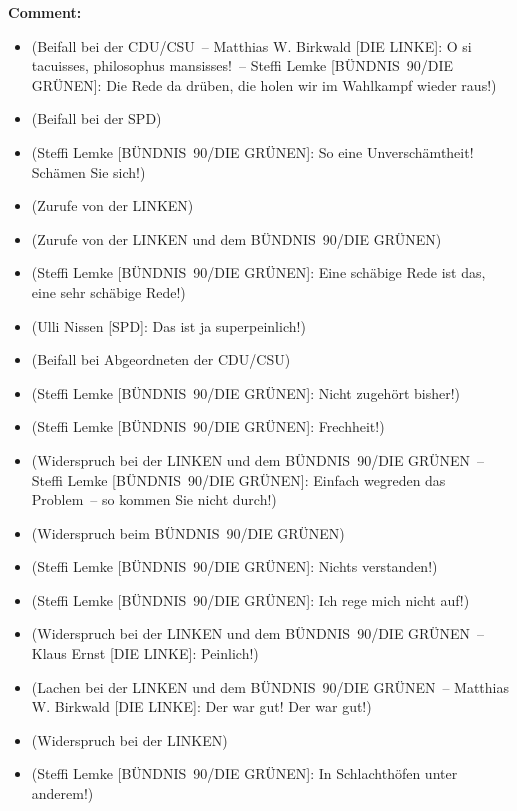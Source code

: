 \documentclass{article}
\begin{document}
\noindent\textbf{Comment:}
\begin{itemize}
    \setlength\itemsep{-3pt}
    \item (Beifall bei der CDU/CSU – Matthias W. Birkwald [DIE LINKE]: O si tacuisses, philosophus mansisses! – Steffi Lemke [BÜNDNIS 90/DIE GRÜNEN]: Die Rede da drüben, die holen wir im Wahlkampf wieder raus!)
    \setlength\itemsep{-3pt}
    \item (Beifall bei der SPD)
    \setlength\itemsep{-3pt}
    \item (Steffi Lemke [BÜNDNIS 90/DIE GRÜNEN]: So eine Unverschämtheit! Schämen Sie sich!)
    \setlength\itemsep{-3pt}
    \item (Zurufe von der LINKEN)
    \setlength\itemsep{-3pt}
    \item (Zurufe von der LINKEN und dem BÜNDNIS 90/DIE GRÜNEN)
    \setlength\itemsep{-3pt}
    \item (Steffi Lemke [BÜNDNIS 90/DIE GRÜNEN]: Eine schäbige Rede ist das, eine sehr schäbige Rede!)
    \setlength\itemsep{-3pt}
    \item (Ulli Nissen [SPD]: Das ist ja superpeinlich!)
    \setlength\itemsep{-3pt}
    \item (Beifall bei Abgeordneten der CDU/CSU)
    \setlength\itemsep{-3pt}
    \item (Steffi Lemke [BÜNDNIS 90/DIE GRÜNEN]: Nicht zugehört bisher!)
    \setlength\itemsep{-3pt}
    \item (Steffi Lemke [BÜNDNIS 90/DIE GRÜNEN]: Frechheit!)
    \setlength\itemsep{-3pt}
    \item (Widerspruch bei der LINKEN und dem BÜNDNIS 90/DIE GRÜNEN – Steffi Lemke [BÜNDNIS 90/DIE GRÜNEN]: Einfach wegreden das Problem – so kommen Sie nicht durch!)
    \setlength\itemsep{-3pt}
    \item (Widerspruch beim BÜNDNIS 90/DIE GRÜNEN)
    \setlength\itemsep{-3pt}
    \item (Steffi Lemke [BÜNDNIS 90/DIE GRÜNEN]: Nichts verstanden!)
    \setlength\itemsep{-3pt}
    \item (Steffi Lemke [BÜNDNIS 90/DIE GRÜNEN]: Ich rege mich nicht auf!)
    \setlength\itemsep{-3pt}
    \item (Widerspruch bei der LINKEN und dem BÜNDNIS 90/DIE GRÜNEN – Klaus Ernst [DIE LINKE]: Peinlich!)
    \setlength\itemsep{-3pt}
    \item (Lachen bei der LINKEN und dem BÜNDNIS 90/DIE GRÜNEN – Matthias W. Birkwald [DIE LINKE]: Der war gut! Der war gut!)
    \setlength\itemsep{-3pt}
    \item (Widerspruch bei der LINKEN)
    \setlength\itemsep{-3pt}
    \item (Steffi Lemke [BÜNDNIS 90/DIE GRÜNEN]: In Schlachthöfen unter anderem!)
\end{itemize}
\end{document}
